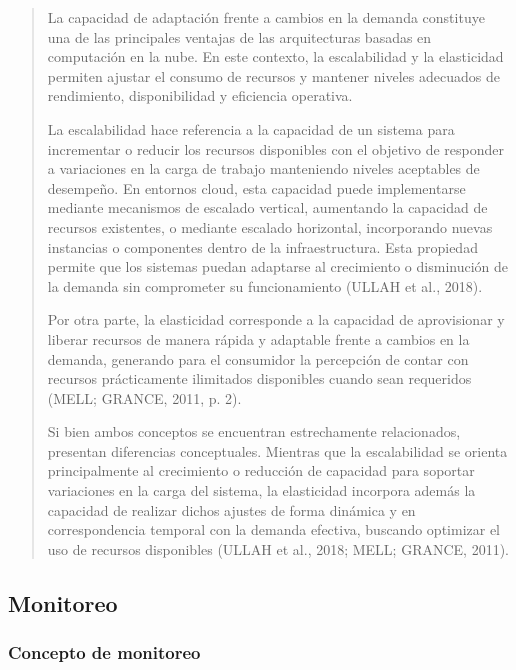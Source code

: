 \documentclass[
]{article}
\begin{document}
\begin{quote}
La capacidad de adaptación frente a cambios en la demanda constituye una
de las principales ventajas de las arquitecturas basadas en computación
en la nube. En este contexto, la escalabilidad y la elasticidad permiten
ajustar el consumo de recursos y mantener niveles adecuados de
rendimiento, disponibilidad y eficiencia operativa.

La escalabilidad hace referencia a la capacidad de un sistema para
incrementar o reducir los recursos disponibles con el objetivo de
responder a variaciones en la carga de trabajo manteniendo niveles
aceptables de desempeño. En entornos cloud, esta capacidad puede
implementarse mediante mecanismos de escalado vertical, aumentando la
capacidad de recursos existentes, o mediante escalado horizontal,
incorporando nuevas instancias o componentes dentro de la
infraestructura. Esta propiedad permite que los sistemas puedan
adaptarse al crecimiento o disminución de la demanda sin comprometer su
funcionamiento (ULLAH et al., 2018).

Por otra parte, la elasticidad corresponde a la capacidad de
aprovisionar y liberar recursos de manera rápida y adaptable frente a
cambios en la demanda, generando para el consumidor la percepción de
contar con recursos prácticamente ilimitados disponibles cuando sean
requeridos (MELL; GRANCE, 2011, p. 2).

Si bien ambos conceptos se encuentran estrechamente relacionados,
presentan diferencias conceptuales. Mientras que la escalabilidad se
orienta principalmente al crecimiento o reducción de capacidad para
soportar variaciones en la carga del sistema, la elasticidad incorpora
además la capacidad de realizar dichos ajustes de forma dinámica y en
correspondencia temporal con la demanda efectiva, buscando optimizar el
uso de recursos disponibles (ULLAH et al., 2018; MELL; GRANCE, 2011).
\end{quote}

\subsection{\texorpdfstring{ Monitoreo}{ Monitoreo}}\label{monitoreo}

\subsubsection{Concepto de monitoreo}\label{concepto-de-monitoreo}
\end{document}
